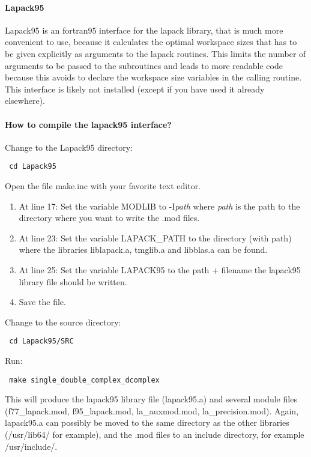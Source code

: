 \documentclass[11p,a4paper]{article}
\begin{document}
\paragraph{Lapack95}
Lapack95 is an fortran95 interface for the lapack library, that is much more convenient to use, because it calculates the optimal workspace sizes that has to be given explicitly as arguments to the lapack routines. This limits the number of arguments to be passed to the subroutines and leads to more readable code because this avoids to declare the workspace size variables in the calling routine. This interface is likely not installed (except if you have used it already elsewhere).
\paragraph{How to compile the lapack95 interface?}
Change to the Lapack95 directory:
\begin{verbatim}
 cd Lapack95
\end{verbatim}
Open the file make.inc with your favorite text editor. 
\begin{enumerate}
 \item At line 17: Set the variable MODLIB to -I\textit{path} where \textit{path} is the path to the directory where you want to write the .mod files.
 \item At line 23: Set the variable LAPACK\_PATH to the directory (with path) where the libraries liblapack.a, tmglib.a and libblas.a can be found.
 \item At line 25: Set the variable LAPACK95 to the path + filename the lapack95 library file should be written. 
 \item Save the file.
\end{enumerate}
Change to the source directory:
\begin{verbatim}
 cd Lapack95/SRC
\end{verbatim}
Run:
\begin{verbatim}
 make single_double_complex_dcomplex
\end{verbatim}
This will produce the lapack95 library file (lapack95.a) and several module files (f77\_lapack.mod, f95\_lapack.mod, la\_auxmod.mod, la\_precision.mod). Again, lapack95.a can possibly be moved to the same directory as the other libraries (/usr/lib64/ for example), and the .mod files to an include directory, for example /usr/include/.
\end{document}
